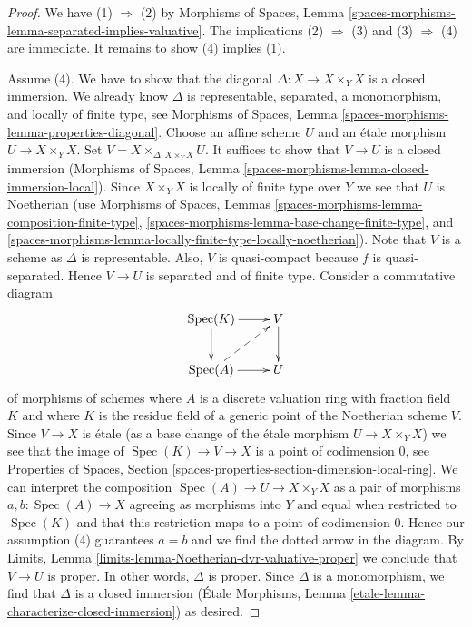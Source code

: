 \documentclass{stacks-project}
\theoremstyle{plain}
\theoremstyle{definition}
\theoremstyle{remark}
\numberwithin{equation}{subsection}
\def\Spec{\mathop{\mathrm{Spec}}}
\begin{document}
\begin{proof}
We have (1) $\Rightarrow$ (2) by
Morphisms of Spaces, Lemma
\ref{spaces-morphisms-lemma-separated-implies-valuative}.
The implications (2) $\Rightarrow$ (3) and (3) $\Rightarrow$ (4)
are immediate. It remains to show (4) implies (1).

\medskip\noindent
Assume (4). We have to show that the diagonal
$\Delta : X \to X \times_Y X$ is a closed
immersion. We already know $\Delta$ is representable, separated,
a monomorphism, and locally of finite type, see Morphisms of Spaces, Lemma
\ref{spaces-morphisms-lemma-properties-diagonal}.
Choose an affine scheme $U$ and an \'etale morphism
$U \to X \times_Y X$. Set $V = X \times_{\Delta, X \times_Y X} U$.
It suffices to show that $V \to U$ is a closed immersion
(Morphisms of Spaces, Lemma
\ref{spaces-morphisms-lemma-closed-immersion-local}).
Since $X \times_Y X$ is locally of finite type over $Y$ we see that
$U$ is Noetherian (use Morphisms of Spaces, Lemmas
\ref{spaces-morphisms-lemma-composition-finite-type},
\ref{spaces-morphisms-lemma-base-change-finite-type}, and
\ref{spaces-morphisms-lemma-locally-finite-type-locally-noetherian}).
Note that $V$ is a scheme as $\Delta$ is representable.
Also, $V$ is quasi-compact because $f$ is quasi-separated.
Hence $V \to U$ is separated and of finite type. Consider a commutative diagram
$$
\xymatrix{
\Spec(K) \ar[r] \ar[d] & V \ar[d] \\
\Spec(A) \ar[r] \ar@{-->}[ru] & U
}
$$
of morphisms of schemes where $A$ is a discrete valuation ring
with fraction field $K$ and where $K$ is the residue field of
a generic point of the Noetherian scheme $V$. Since $V \to X$
is \'etale (as a base change of the \'etale morphism $U \to X \times_Y X$)
we see that the image of $\Spec(K) \to V \to X$ is a point of
codimension $0$, see Properties of Spaces, Section
\ref{spaces-properties-section-dimension-local-ring}.
We can interpret the composition $\Spec(A) \to U \to X \times_Y X$
as a pair of morphisms $a, b : \Spec(A) \to X$ agreeing as morphisms
into $Y$ and equal when restricted to $\Spec(K)$ and that this
restriction maps to a point of codimension $0$. Hence our assumption
(4) guarantees $a = b$ and we find the dotted arrow in the diagram.
By Limits, Lemma \ref{limits-lemma-Noetherian-dvr-valuative-proper}
we conclude that $V \to U$ is proper. In other words, $\Delta$ is proper.
Since $\Delta$ is a monomorphism, we find that $\Delta$ is a
closed immersion (\'Etale Morphisms, Lemma
\ref{etale-lemma-characterize-closed-immersion}) as desired.
\end{proof}
\end{document}
